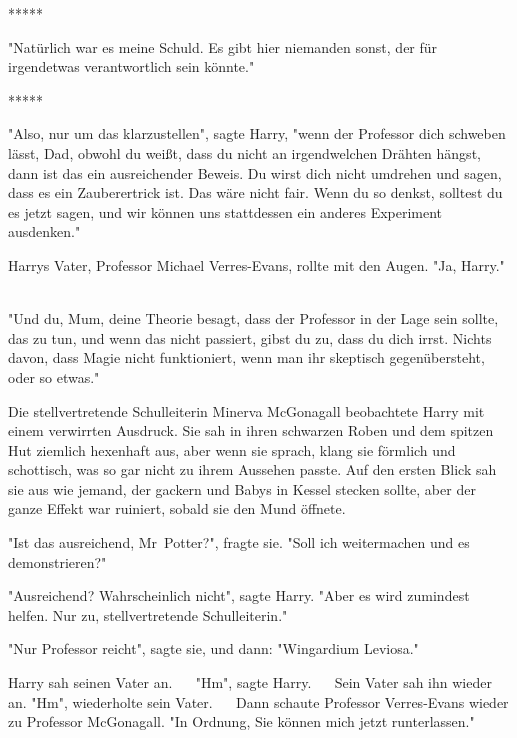 

\hypertarget{alles-was-ich-glaubte-ist-falsch.}{%

*****

"Natürlich war es meine Schuld. Es gibt hier niemanden sonst, der für irgendetwas verantwortlich sein könnte." ~ ~

*****

"Also, nur um das klarzustellen", sagte Harry, "wenn der Professor dich schweben lässt, Dad, obwohl du weißt, dass du nicht an irgendwelchen Drähten hängst, dann ist das ein ausreichender Beweis. Du wirst dich nicht umdrehen und sagen, dass es ein Zauberertrick ist. Das wäre nicht fair. Wenn du so denkst, solltest du es jetzt sagen, und wir können uns stattdessen ein anderes Experiment ausdenken." ~ ~

Harrys Vater, Professor Michael Verres-Evans, rollte mit den Augen. "Ja, Harry." ~

"Und du, Mum, deine Theorie besagt, dass der Professor in der Lage sein sollte, das zu tun, und wenn das nicht passiert, gibst du zu, dass du dich irrst. Nichts davon, dass Magie nicht funktioniert, wenn man ihr skeptisch gegenübersteht, oder so etwas."

Die stellvertretende Schulleiterin Minerva McGonagall beobachtete Harry mit einem verwirrten Ausdruck. Sie sah in ihren schwarzen Roben und dem spitzen Hut ziemlich hexenhaft aus, aber wenn sie sprach, klang sie förmlich und schottisch, was so gar nicht zu ihrem Aussehen passte. Auf den ersten Blick sah sie aus wie jemand, der gackern und Babys in Kessel stecken sollte, aber der ganze Effekt war ruiniert, sobald sie den Mund öffnete.

"Ist das ausreichend, Mr~Potter?", fragte sie. "Soll ich weitermachen und es demonstrieren?" ~ ~

"Ausreichend? Wahrscheinlich nicht", sagte Harry. "Aber es wird zumindest helfen. Nur zu, stellvertretende Schulleiterin."

"Nur Professor reicht", sagte sie, und dann: "Wingardium Leviosa." ~ ~

Harry sah seinen Vater an. ~ ~"Hm", sagte Harry. ~ ~Sein Vater sah ihn wieder an. "Hm", wiederholte sein Vater. ~ ~Dann schaute Professor Verres-Evans wieder zu Professor McGonagall. "In Ordnung, Sie können mich jetzt runterlassen." ~ ~

}
